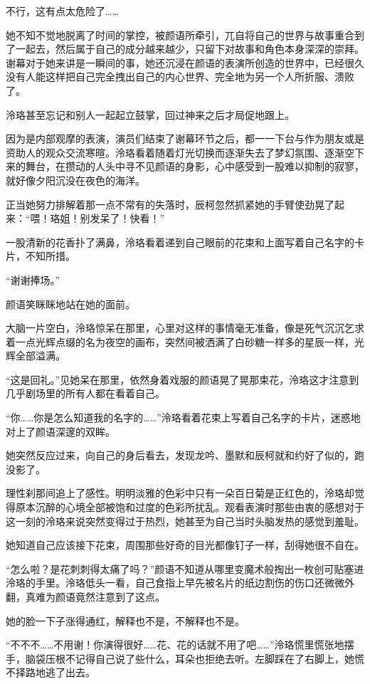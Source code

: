 \documentclass[UTF8, scheme = chinese, openany]{ctexbook}
\begin{document}
不行，这有点太危险了……

她不知不觉地脱离了时间的掌控，被颜语所牵引，兀自将自己的世界与故事重合到了一起去，然后属于自己的成分越来越少，只留下对故事和角色本身深深的崇拜。谢幕对于她来讲是一瞬间的事，她还沉浸在颜语的表演所创造的世界中，已经很久没有人能这样把自己完全拽出自己的内心世界、完全地为另一个人所折服、溃败了。

泠珞甚至忘记和别人一起起立鼓掌，回过神来之后才局促地跟上。

因为是内部观摩的表演，演员们结束了谢幕环节之后，都一一下台与作为朋友或是资助人的观众交流寒暄。泠珞看着随着灯光切换而逐渐失去了梦幻氛围、逐渐空下来的舞台，在攒动的人头中寻不见颜语的身影，心中感受到一股难以抑制的寂寥，就好像夕阳沉没在夜色的海洋。

正当她努力排解着那一点不常有的失落时，辰柯忽然抓紧她的手臂使劲晃了起来：“喂！珞姐！别发呆了！快看！”

一股清新的花香扑了满鼻，泠珞看着递到自己眼前的花束和上面写着自己名字的卡片，不知所措。

“谢谢捧场。”

颜语笑眯眯地站在她的面前。

\vspace{1.5em}

大脑一片空白，泠珞惊呆在那里，心里对这样的事情毫无准备，像是死气沉沉乞求着一点光辉点缀的名为夜空的画布，突然间被洒满了白砂糖一样多的星辰一样，光辉全部溢满。

“这是回礼。”见她呆在那里，依然身着戏服的颜语晃了晃那束花，泠珞这才注意到几乎剧场里的所有人都在看着自己。

“你……你是怎么知道我的名字的……”泠珞看着花束上写着自己名字的卡片，迷惑地对上了颜语深邃的双眸。

她突然反应过来，向自己的身后看去，发现龙吟、墨默和辰柯就和约好了似的，跑没影了。

理性刹那间追上了感性。明明淡雅的色彩中只有一朵百日菊是正红色的，泠珞却觉得原本沉醉的心境全部被饱和过度的色彩所扰乱。观看表演时那些由衷的感想对于这一刻的泠珞来说突然变得过于热烈，她甚至为自己当时头脑发热的感觉到羞耻。

她知道自己应该接下花束，周围那些好奇的目光都像钉子一样，刮得她很不自在。

“怎么啦？是花刺刺得太痛了吗？”颜语不知道从哪里变魔术般掏出一枚创可贴塞进泠珞的手里。泠珞低头一看，自己食指上早先被名片的纸边割伤的伤口还微微外翻，真难为颜语竟然注意到了这点。

她的脸一下子涨得通红，解释也不是，不解释也不是。

“不不不……不用谢！你演得很好……花、花的话就不用了吧……”泠珞慌里慌张地摆手，脑袋压根不记得自己说了些什么，耳朵也拒绝去听。左脚踩在了右脚上，她慌不择路地逃了出去。
\end{document}
